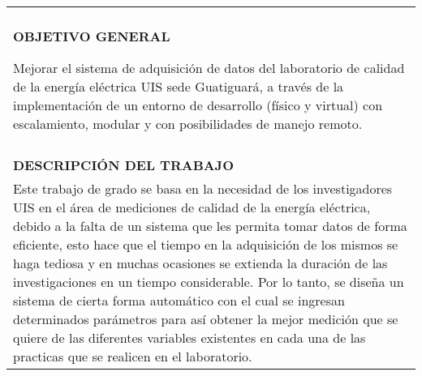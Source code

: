 \begin{tabular}{| p{15.5cm} |}
\hline
\\
\textbf{OBJETIVO GENERAL}

Mejorar el sistema de adquisición de datos del laboratorio de calidad de la energía eléctrica UIS sede Guatiguará, a través de la implementación de un entorno de desarrollo (físico y virtual) con escalamiento, modular y con posibilidades de manejo remoto.\\

\\
\textbf{DESCRIPCIÓN DEL TRABAJO}  
\\
Este trabajo de grado se basa en la necesidad de los investigadores UIS en el área de mediciones de calidad de la energía eléctrica, debido a la falta de un sistema que les permita tomar datos de forma eficiente, esto hace que el tiempo en la adquisición de los mismos se haga tediosa y en muchas ocasiones se extienda la duración de las investigaciones en un tiempo considerable. Por lo tanto, se diseña un sistema de cierta forma automático con el cual se ingresan determinados parámetros para así obtener la mejor medición que se quiere de las diferentes variables existentes en cada una de las practicas que se realicen en el laboratorio.     

\\[0.1cm] \hline
\end{tabular}
			



